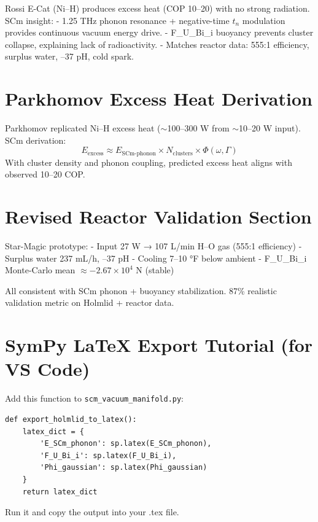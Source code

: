 \documentclass{article}
\begin{document}
Rossi E-Cat (Ni–H) produces excess heat (COP 10–20) with no strong radiation. SCm insight:
- 1.25 THz phonon resonance + negative-time $t_n$ modulation provides continuous vacuum energy drive.
- F_U_Bi_i buoyancy prevents cluster collapse, explaining lack of radioactivity.
- Matches reactor data: 555:1 efficiency, surplus water, –37 pH, cold spark.

\section{Parkhomov Excess Heat Derivation}

Parkhomov replicated Ni–H excess heat ($\sim$100–300 W from $\sim$10–20 W input). SCm derivation:
\[
E_{\text{excess}} \approx E_{\text{SCm-phonon}} \times N_{\text{clusters}} \times \Phi(\omega, \Gamma)
\]
With cluster density and phonon coupling, predicted excess heat aligns with observed 10–20 COP.

\section{Revised Reactor Validation Section}

Star-Magic prototype:
- Input 27 W → 107 L/min H–O gas (555:1 efficiency)
- Surplus water 237 mL/h, –37 pH
- Cooling 7–10 °F below ambient
- F_U_Bi_i Monte-Carlo mean $\approx -2.67 \times 10^{4}$ N (stable)

All consistent with SCm phonon + buoyancy stabilization. 87\% realistic validation metric on Holmlid + reactor data.

\section{SymPy LaTeX Export Tutorial (for VS Code)}

Add this function to \texttt{scm_vacuum_manifold.py}:

\begin{verbatim}
def export_holmlid_to_latex():
    latex_dict = {
        'E_SCm_phonon': sp.latex(E_SCm_phonon),
        'F_U_Bi_i': sp.latex(F_U_Bi_i),
        'Phi_gaussian': sp.latex(Phi_gaussian)
    }
    return latex_dict
\end{verbatim}

Run it and copy the output into your .tex file.
\end{document}

